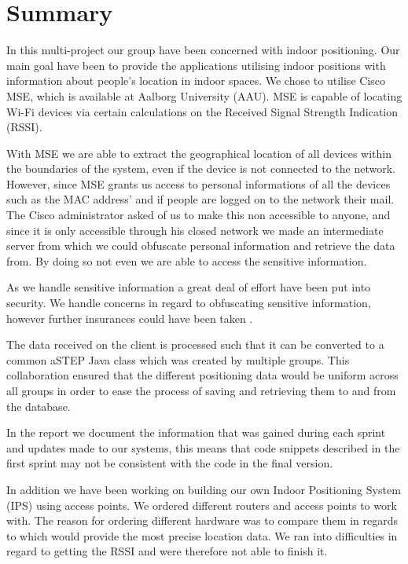 \chapter*{Summary}
In this multi-project our group have been concerned with indoor positioning. Our main goal have been to provide the applications utilising indoor positions with information about people's location in indoor spaces. We chose to utilise Cisco MSE, which is available at Aalborg University (AAU). MSE is capable of locating Wi-Fi devices via certain calculations on the Received Signal Strength Indication (RSSI).

With MSE we are able to extract the geographical location of all devices within the boundaries of the system, even if the device is not connected to the network. However, since MSE grants us access to personal informations of all the devices such as the MAC address' and if people are logged on to the network their mail. The Cisco administrator asked of us to make this non accessible to anyone, and since it is only accessible through his closed network we made an intermediate server from which we could obfuscate personal information and retrieve the data from. By doing so not even we are able to access the sensitive information. 

As we handle sensitive information a great deal of effort have been put into security. We handle concerns in regard to obfuscating sensitive information, however further insurances could have been taken%
.

The data received on the client is processed such that it can be converted to a common aSTEP Java class which was created by multiple groups. This collaboration ensured that the different positioning data would be uniform across all groups in order to ease the process of saving and retrieving them to and from the database.

In the report we document the information that was gained during each sprint and updates made to our systems, this means that code snippets described in the first sprint may not be consistent with the code in the final version.

In addition we have been working on building our own Indoor Positioning System (IPS) using access points. We ordered different routers and access points to work with. The reason for ordering different hardware was to compare them in regards to which would provide the most precise location data. We ran into difficulties in regard to getting the RSSI and were therefore not able to finish it.

